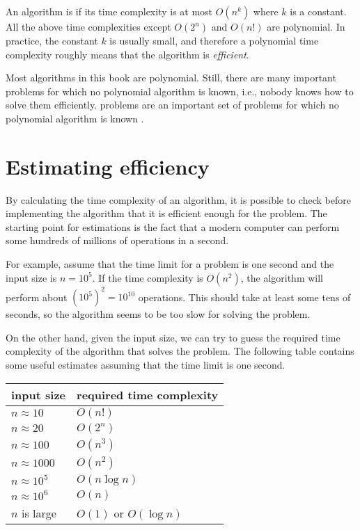 An algorithm is 
if its time complexity is at most $O(n^k)$
where $k$ is a constant.
All the above time complexities except
$O(2^n)$ and $O(n!)$ are polynomial.
In practice, the constant $k$ is usually small,
and therefore a polynomial time complexity
roughly means that the algorithm is \emph{efficient}.


Most algorithms in this book are polynomial.
Still, there are many important problems for which
no polynomial algorithm is known, i.e.,
nobody knows how to solve them efficiently.
 problems are an important set
of problems for which no polynomial algorithm is known \cite{gar79}.

\section{Estimating efficiency}

By calculating the time complexity of an algorithm,
it is possible to check before
implementing the algorithm that it is
efficient enough for the problem.
The starting point for estimations is the fact that
a modern computer can perform some hundreds of
millions of operations in a second.

For example, assume that the time limit for
a problem is one second and the input size is $n=10^5$.
If the time complexity is $O(n^2)$,
the algorithm will perform about $(10^5)^2=10^{10}$ operations.
This should take at least some tens of seconds,
so the algorithm seems to be too slow for solving the problem.

On the other hand, given the input size,
we can try to guess
the required time complexity of the algorithm
that solves the problem.
The following table contains some useful estimates
assuming that the time limit is one second.

\begin{center}
\begin{tabular}{ll}
input size & required time complexity \\
\hline
$n \approx 10$ & $O(n!)$ \\
$n \approx 20$ & $O(2^n)$ \\
$n \approx 100$ & $O(n^3)$ \\
$n \approx 1000$ & $O(n^2)$ \\
$n \approx 10^5$ & $O(n \log n)$ \\
$n \approx 10^6$ & $O(n)$ \\
$n$ is large & $O(1)$ or $O(\log n)$ \\
\end{tabular}
\end{center}

